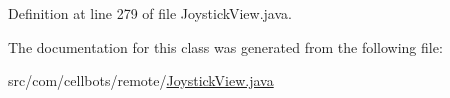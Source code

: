 Definition at line 279 of file Joystick\-View.\-java.



The documentation for this class was generated from the following file\-:\begin{DoxyCompactItemize}
\item 
src/com/cellbots/remote/\hyperlink{_joystick_view_8java}{Joystick\-View.\-java}\end{DoxyCompactItemize}
